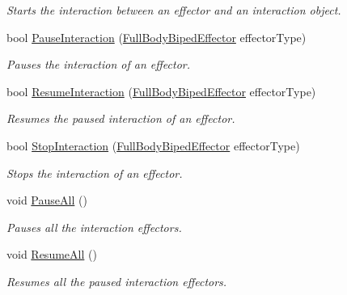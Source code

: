 \begin{DoxyCompactItemize}
\begin{DoxyCompactList}\small\item\em Starts the interaction between an effector and an interaction object. \end{DoxyCompactList}\item 
bool \mbox{\hyperlink{class_root_motion_1_1_final_i_k_1_1_interaction_system_a219e9512a92a3cbc8c582932d9d20ac7}{Pause\+Interaction}} (\mbox{\hyperlink{namespace_root_motion_1_1_final_i_k_ae0dd2058c7667b6f132c11a6b860c14a}{Full\+Body\+Biped\+Effector}} effector\+Type)
\begin{DoxyCompactList}\small\item\em Pauses the interaction of an effector. \end{DoxyCompactList}\item 
bool \mbox{\hyperlink{class_root_motion_1_1_final_i_k_1_1_interaction_system_ac201f874a5a9e7f12e648329d5f8e31a}{Resume\+Interaction}} (\mbox{\hyperlink{namespace_root_motion_1_1_final_i_k_ae0dd2058c7667b6f132c11a6b860c14a}{Full\+Body\+Biped\+Effector}} effector\+Type)
\begin{DoxyCompactList}\small\item\em Resumes the paused interaction of an effector. \end{DoxyCompactList}\item 
bool \mbox{\hyperlink{class_root_motion_1_1_final_i_k_1_1_interaction_system_ac26ccf2f66ed2bbbf112b285651decf1}{Stop\+Interaction}} (\mbox{\hyperlink{namespace_root_motion_1_1_final_i_k_ae0dd2058c7667b6f132c11a6b860c14a}{Full\+Body\+Biped\+Effector}} effector\+Type)
\begin{DoxyCompactList}\small\item\em Stops the interaction of an effector. \end{DoxyCompactList}\item 
void \mbox{\hyperlink{class_root_motion_1_1_final_i_k_1_1_interaction_system_a8842a5ad71cdbf0541588fed52533443}{Pause\+All}} ()
\begin{DoxyCompactList}\small\item\em Pauses all the interaction effectors. \end{DoxyCompactList}\item 
void \mbox{\hyperlink{class_root_motion_1_1_final_i_k_1_1_interaction_system_a19f513364b351e2248196e99abb14071}{Resume\+All}} ()
\begin{DoxyCompactList}\small\item\em Resumes all the paused interaction effectors. \end{DoxyCompactList}\item 

\end{DoxyCompactItemize}
